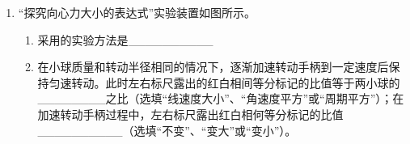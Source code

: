 \documentclass[\gkver]{gaokaozhenti}
\begin{document}
\begin{enumerate}
{B．该实验只要使得小车加速运动即可，不需要倾斜轨道补偿阻力，选项 B 错误；

C．为了充分利用纸带，则小车靠近打点计时器静止释放，选项 C 正确；

D．先接通电源再释放小车，选项 D 正确。故选 ACD。

（2）计数点 1 的读数为 $2.75\Ucm$。打点周期 $T = 0.02\Us$，则打计数点 2 时小车的速度大小为 $v_{2}=\frac{x_{13}}{2T}=\frac{(8.65-2.75)\times10^{-2}}{0.04}\Ums=1.48\Ums$。
}

\item
“探究向心力大小的表达式”实验装置如图所示。
\begin{enumerate}
	\item
	采用的实验方法是\_\_\_\_\_\_\_\_\_\_
	\item
	在小球质量和转动半径相同的情况下，逐渐加速转动手柄到一定速度后保持匀速转动。此时左右标尺露出的红白相间等分标记的比值等于两小球的\_\_\_\_\_\_\_\_之比（选填“线速度大小”、“角速度平方”或“周期平方”）；在加速转动手柄过程中，左右标尺露出红白相何等分标记的比值\_\_\_\_\_\_\_\_\_\_（选填“不变”、“变大”或“变小”）。
\end{enumerate}


\end{enumerate}
\end{document}
